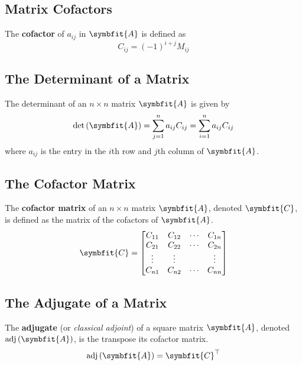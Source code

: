 \documentclass{article}
\begin{document}
	\subsection{Matrix Cofactors}
	\begin{definition}
		The \textbf{cofactor} of $a_{ij}$ in $\symbfit{A}$ is defined as
		\begin{equation*}
			C_{ij} = \left( -1 \right)^{i+j} M_{ij}
		\end{equation*}
	\end{definition}
	\subsection{The Determinant of a Matrix}
	\begin{theorem}
		The determinant of an $n\times n$ matrix $\symbfit{A}$ is given by
		\begin{equation*}
			\det{\left( \symbfit{A} \right)} = \sum_{j=1}^n a_{ij}C_{ij} = \sum_{i=1}^n a_{ij}C_{ij}
		\end{equation*}
		where $a_{ij}$ is the entry in the $i$th row and $j$th column of $\symbfit{A}$.
	\end{theorem}
	\subsection{The Cofactor Matrix}
	\begin{definition}
		The \textbf{cofactor matrix} of an $n\times n$ matrix $\symbfit{A}$, denoted $\symbfit{C}$, is defined as the matrix of the cofactors of $\symbfit{A}$.
		\begin{equation*}
			\symbfit{C} = \mqty[
				C_{11} & C_{12} & \cdots & C_{1n} \\
				C_{21} & C_{22} & \cdots & C_{2n} \\
				\vdots & \vdots &        & \vdots \\
				C_{n1} & C_{n2} & \cdots & C_{nn}
				]
		\end{equation*}
	\end{definition}
	\subsection{The Adjugate of a Matrix}
	\begin{definition}
		The \textbf{adjugate} (or \textit{classical adjoint}) of a square matrix $\symbfit{A}$, denoted $\adj{\left( \symbfit{A} \right)}$, is the transpose its cofactor matrix.
		\begin{equation*}
			\adj{\left( \symbfit{A} \right)} = \symbfit{C}^\top
		\end{equation*}
	\end{definition}
\end{document}
